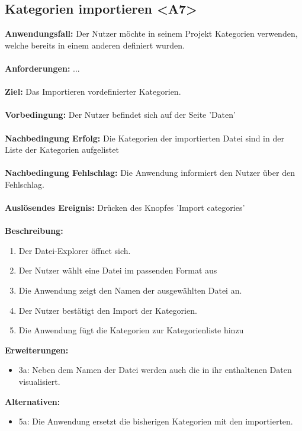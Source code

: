\documentclass[parskip=full]{scrartcl} %
\begin{document}
\subsection*{Kategorien importieren <A7>}
\textbf{Anwendungsfall:} Der Nutzer möchte in seinem Projekt Kategorien verwenden, welche bereits in einem anderen definiert wurden.\\\\
\textbf{Anforderungen:} ...\\\\
\textbf{Ziel:} Das Importieren vordefinierter Kategorien. \\\\
\textbf{Vorbedingung:} Der Nutzer befindet sich auf der Seite 'Daten' \\\\
\textbf{Nachbedingung Erfolg:} Die Kategorien der importierten Datei sind in der Liste der Kategorien aufgelistet \\\\
\textbf{Nachbedingung Fehlschlag:} Die Anwendung informiert den Nutzer über den Fehlschlag. \\\\
\textbf{Auslösendes Ereignis:} Drücken des Knopfes 'Import categories'\\\\
\textbf{Beschreibung:}
\begin{enumerate}
    \item Der Datei-Explorer öffnet sich.
    \item Der Nutzer wählt eine Datei im passenden Format aus
    \item Die Anwendung zeigt den Namen der ausgewählten Datei an.
    \item Der Nutzer bestätigt den Import der Kategorien.
    \item Die Anwendung fügt die Kategorien zur Kategorienliste hinzu
\end{enumerate}
\textbf{Erweiterungen:} 
\begin{itemize}
    \item 3a: Neben dem Namen der Datei werden auch die in ihr enthaltenen Daten visualisiert.
\end{itemize}
\textbf{Alternativen:} 
\begin{itemize}
    \item 5a: Die Anwendung ersetzt die bisherigen Kategorien mit den importierten.
\end{itemize}
\newpage
\end{document}
